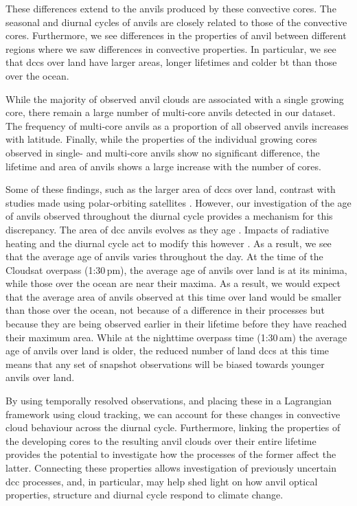 These differences extend to the anvils produced by these convective cores.
The seasonal and diurnal cycles of anvils are closely related to those of the convective cores.
Furthermore, we see differences in the properties of anvil between different regions where we saw differences in convective properties.
In particular, we see that \acrshort{dcc}s over land have larger areas, longer lifetimes and colder \acrshort{bt} than those over the ocean.

While the majority of observed anvil clouds are associated with a single growing core, there remain a large number of multi-core anvils detected in our dataset.
The frequency of multi-core anvils as a proportion of all observed anvils increases with latitude.
Finally, while the properties of the individual growing cores observed in single- and multi-core anvils show no significant difference, the lifetime and area of anvils shows a large increase with the number of cores.

Some of these findings, such as the larger area of \acrshort{dcc}s over land, contrast with studies made using polar-orbiting satellites \citep{ge_contrasting_2024}.
However, our investigation of the age of anvils observed throughout the diurnal cycle provides a mechanism for this discrepancy.
The area of \acrshort{dcc} anvils evolves as they age \citep{futyan_deep_2007}.
Impacts of radiative heating and the diurnal cycle act to modify this however \citep{gasparini_diurnal_2022}.
As a result, we see that the average age of anvils varies throughout the day.
At the time of the Cloudsat overpass (1:30\,pm), the average age of anvils over land is at its minima, while those over the ocean are near their maxima.
As a result, we would expect that the average area of anvils observed at this time over land would be smaller than those over the ocean, not because of a difference in their processes but because they are being observed earlier in their lifetime before they have reached their maximum area.
While at the nighttime overpass time (1:30\,am) the average age of anvils over land is older, the reduced number of land \acrshort{dcc}s at this time means that any set of snapshot observations will be biased towards younger anvils over land.

By using temporally resolved observations, and placing these in a Lagrangian framework using cloud tracking, we can account for these changes in convective cloud behaviour across the diurnal cycle.
Furthermore, linking the properties of the developing cores to the resulting anvil clouds over their entire lifetime provides the potential to investigate how the processes of the former affect the latter.
Connecting these properties allows investigation of previously uncertain \acrshort{dcc} processes, and, in particular, may help shed light on how anvil optical properties, structure and diurnal cycle respond to climate change.

